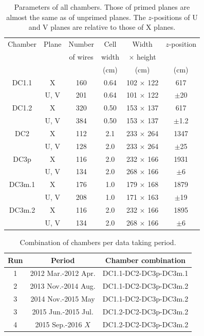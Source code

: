 \begin{table}[bthp]\centering
  \caption{Parameters of all chambers.
    Those of primed planes are almost the same as of unprimed planes.
    The $z$-positions of U and V planes are relative to those of X planes.
  }
  \label{table:cham:param}
  \begin{tabular}{cc|cccc}
    \hline
    Chamber & Plane & Number   & Cell  & Width            & $z$-position \\
            &       & of wires & width & $\times$ height  &      \\ 
            &       &          & (cm)  & (cm)             & (cm) \\ 
    \hline
    DC1.1    & X     & 160      & 0.64  & 102 $\times$ 122 &  617    \\
             & U, V  & 201      & 0.64  & 101 $\times$ 122 & $\pm$20 \\
    DC1.2    & X     & 320      & 0.50  & 153 $\times$ 137 &  617    \\
             & U, V  & 384      & 0.50  & 153 $\times$ 137 & $\pm$1.2 \\
    DC2      & X     & 112      & 2.1   & 233 $\times$ 264 & 1347    \\
             & U, V  & 128      & 2.0   & 233 $\times$ 264 & $\pm$25 \\
    DC3p     & X     & 116      & 2.0   & 232 $\times$ 166 & 1931    \\
             & U, V  & 134      & 2.0   & 268 $\times$ 166 & $\pm$6  \\
    DC3m.1   & X     & 176      & 1.0   & 179 $\times$ 168 & 1879    \\
             & U, V  & 208      & 1.0   & 171 $\times$ 163 & $\pm$19 \\
    DC3m.2   & X     & 116      & 2.0   & 232 $\times$ 166 & 1895    \\
             & U, V  & 134      & 2.0   & 268 $\times$ 166 & $\pm$6  \\
    \hline
  \end{tabular}
\end{table}

\begin{table}[bthp]\centering
  \caption{Combination of chambers per data taking period.}
  \label{tab:cham:comb}
  \begin{tabular}{ccc}
    \hline
    Run & Period & Chamber combination \\
    \hline
    1 & 2012 Mar.-2012 Apr.  &  DC1.1-DC2-DC3p-DC3m.1 \\
    2 & 2013 Nov.-2014 Aug.  &  DC1.1-DC2-DC3p-DC3m.2 \\
    3 & 2014 Nov.-2015 May   &  DC1.1-DC2-DC3p-DC3m.2 \\
    3 & 2015 Jun.-2015 Jul.  &  DC1.2-DC2-DC3p-DC3m.2 \\
    4 & 2015 Sep.-2016 $X$   &  DC1.2-DC2-DC3p-DC3m.2 \\
    \hline
  \end{tabular}
\end{table}

